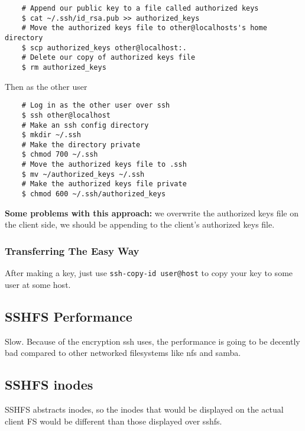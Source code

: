\begin{verbatim}
	# Append our public key to a file called authorized keys
	$ cat ~/.ssh/id_rsa.pub >> authorized_keys
	# Move the authorized keys file to other@localhosts's home directory
	$ scp authorized_keys other@localhost:.
	# Delete our copy of authorized keys file
	$ rm authorized_keys
\end{verbatim}
Then as the other user
\begin{verbatim}
	# Log in as the other user over ssh
	$ ssh other@localhost
	# Make an ssh config directory
	$ mkdir ~/.ssh
	# Make the directory private
	$ chmod 700 ~/.ssh
	# Move the authorized keys file to .ssh
	$ mv ~/authorized_keys ~/.ssh
	# Make the authorized keys file private 
	$ chmod 600 ~/.ssh/authorized_keys
\end{verbatim}
\textbf{Some problems with this approach:} we overwrite the authorized keys file on the client side, we should be appending to the client's authorized keys file.
\subsubsection{Transferring The Easy Way}
After making a key, just use \texttt{ssh-copy-id user@host} to copy your key to some user at some host.
\subsection{SSHFS Performance}
Slow. Because of the encryption ssh uses, the performance is going to be decently bad compared to other networked filesystems like nfs and samba. 
\subsection{SSHFS inodes}
SSHFS abstracts inodes, so the inodes that would be displayed on the actual client FS would be different than those displayed over sshfs.